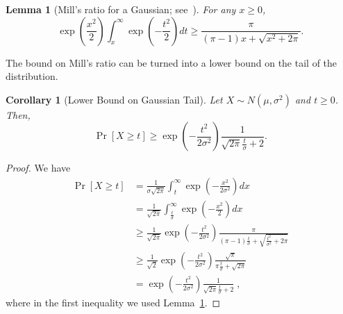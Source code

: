 \documentclass{article}
\newtheorem{lemma}[theorem]{Lemma}
\newtheorem{corrollary}[theorem]{Corollary}
\begin{document}
\begin{lemma}[Mill's ratio for a Gaussian; see~\cite{Boyd59}]
\label{lemma:boyd}
For any $x \ge 0$,
\[
\exp\left(\frac{x^2}{2}\right) \int_x^{\infty} \exp\left(-\frac{t^2}{2}\right) dt
\ge \frac{\pi}{(\pi-1)x+\sqrt{x^2+2 \pi}}.
\]
\end{lemma}

The bound on Mill's ratio can be turned into a lower bound on the tail of the distribution.

\begin{corrollary}[Lower Bound on Gaussian Tail]
Let $X \sim N(\mu, \sigma^2)$ and $t \ge 0$. Then,
$$
\Pr[X \ge t] \geq \exp\left(-\frac{t^2}{2 \sigma^2}\right) \frac{1}{\sqrt{2\pi}\frac{t}{\sigma}+2}.
$$
\end{corrollary}

\begin{proof}
We have
\begin{align*}
\Pr[X \ge t]
&= \frac{1}{\sigma \sqrt{2 \pi}} \int_t^{\infty} \exp \left( -\frac{x^2}{2 \sigma^2} \right) d x \\
&= \frac{1}{\sqrt{2 \pi}} \int_\frac{t}{\sigma}^{\infty} \exp \left( -\frac{x^2}{2} \right) d x \\
&\ge \frac{1}{\sqrt{2 \pi}} \exp\left(-\frac{t^2}{2 \sigma^2}\right) \frac{\pi}{(\pi-1)\frac{t}{\sigma}+\sqrt{\frac{t^2}{\sigma^2}+2 \pi}} \\
&\ge \frac{1}{\sqrt{2}} \exp\left(-\frac{t^2}{2 \sigma^2}\right) \frac{\sqrt{\pi}}{\pi\frac{t}{\sigma}+\sqrt{2 \pi}} \\
&= \exp\left(-\frac{t^2}{2 \sigma^2}\right) \frac{1}{\sqrt{2\pi}\frac{t}{\sigma}+2} \; ,
\end{align*}
where in the first inequality we used Lemma~\ref{lemma:boyd}.
\end{proof}
\end{document}
